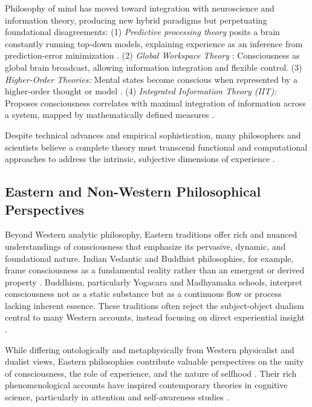 Philosophy of mind has moved toward integration with neuroscience and information theory, producing new hybrid paradigms but perpetuating foundational disagreements: (1) \emph{Predictive processing theory} posits a brain constantly running top-down models, explaining experience as an inference from prediction-error minimization \cite{seth2022theories}. (2) \emph{Global Workspace Theory} \cite{baars2001conscious}: Consciousness as global brain broadcast, allowing information integration and flexible control. (3) \emph{Higher-Order Theories:} Mental states become conscious when represented by a higher-order thought or model \cite{rosenthal2009concepts}. (4) \emph{Integrated Information Theory (IIT):} Proposes consciousness correlates with maximal integration of information across a system, mapped by mathematically defined measures \cite{tononi2016integrated}.

Despite technical advances and empirical sophistication, many philosophers and scientists believe a complete theory must transcend functional and computational approaches to address the intrinsic, subjective dimensions of experience \cite{chalmers2000conscious,garridomerchan2024machine}.

\subsection{Eastern and Non-Western Philosophical Perspectives}

Beyond Western analytic philosophy, Eastern traditions offer rich and nuanced understandings of consciousness that emphasize its pervasive, dynamic, and foundational nature. Indian Vedantic and Buddhist philosophies, for example, frame consciousness as a fundamental reality rather than an emergent or derived property \cite{vonbraun2021consciousness}. Buddhism, particularly Yogacara and Madhyamaka schools, interpret consciousness not as a static substance but as a continuous flow or process lacking inherent essence. These traditions often reject the subject-object dualism central to many Western accounts, instead focusing on direct experiential insight \cite{siderits2007buddhism}.

While differing ontologically and metaphysically from Western physicalist and dualist views, Eastern philosophies contribute valuable perspectives on the unity of consciousness, the role of experience, and the nature of selfhood \cite{vonbraun2021consciousness}. Their rich phenomenological accounts have inspired contemporary theories in cognitive science, particularly in attention and self-awareness studies \cite{graziano2022framework}.

